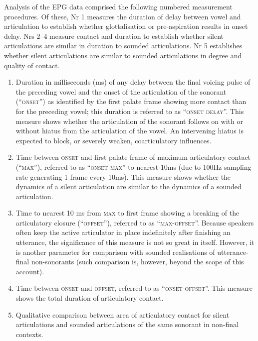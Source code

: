 \documentclass[output=paper]{langscibook}
\begin{document}
Analysis of the EPG data comprised the following numbered measurement procedures. Of these, Nr 1 measures the duration of delay between vowel and articulation to establish whether glottalisation or pre-aspiration results in onset delay. Nrs 2–4 measure contact and duration to establish whether silent articulations are similar in duration to sounded articulations. Nr 5 establishes whether silent articulations are similar to sounded articulations in degree and quality of contact.

\begin{enumerate}
\item Duration in milliseconds (ms) of any delay between the final voicing pulse of the preceding vowel and the onset of the articulation of the sonorant (``\textsc{onset''})
as identified by the first palate frame showing more contact than for the preceding vowel; this duration is referred to as ``\textsc{onset} \textsc{delay}''. This measure shows whether the articulation of the sonorant follows on with or without hiatus from the articulation of the vowel. An intervening hiatus is expected to block, or severely weaken, coarticulatory influences.
\item Time between \textsc{onset} and first palate frame of maximum articulatory contact (``\textsc{max}''),
referred to as ``\textsc{onset-max}'' to nearest 10ms (due to 100Hz sampling rate generating 1 frame every 10ms). This measure shows whether the dynamics of a silent articulation are similar to the dynamics of a sounded articulation.
\item Time to nearest 10 ms from \textsc{max} to first frame showing a breaking of the articulatory closure (``\textsc{offset}''), referred
to as ``\textsc{max-offset}''. Because speakers often keep the active articulator in place indefinitely after finishing an utterance, the significance of this measure is not so great in itself. However, it is another parameter for comparison with sounded realisations of utterance-final non-sonorants (such comparison is, however, beyond the scope of this account).
\item Time between \textsc{onset} and \textsc{offset}, referred to as ``\textsc{onset-offset}''. This measure shows the total duration of articulatory contact.
\item Qualitative comparison between area of articulatory contact for silent articulations and sounded articulations of the same sonorant in non-final contexts.
\end{enumerate}
\end{document}
